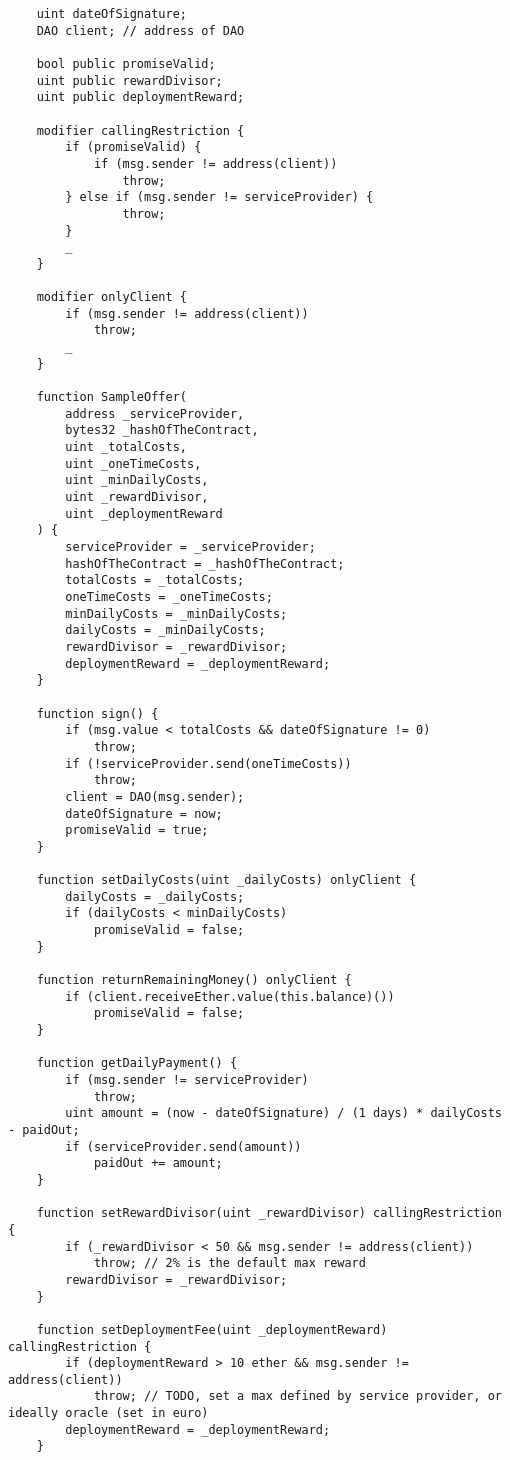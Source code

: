 \documentclass[9pt,oneside]{amsart}
\begin{document}
\begin{appendix}
\begin{verbatim}
    uint dateOfSignature;
    DAO client; // address of DAO

    bool public promiseValid;
    uint public rewardDivisor;
    uint public deploymentReward;

    modifier callingRestriction {
        if (promiseValid) {
            if (msg.sender != address(client))
                throw;
        } else if (msg.sender != serviceProvider) {
                throw;
        }
        _
    }

    modifier onlyClient {
        if (msg.sender != address(client))
            throw;
        _
    }

    function SampleOffer(
        address _serviceProvider,
        bytes32 _hashOfTheContract,
        uint _totalCosts,
        uint _oneTimeCosts,
        uint _minDailyCosts,
        uint _rewardDivisor,
        uint _deploymentReward
    ) {
        serviceProvider = _serviceProvider;
        hashOfTheContract = _hashOfTheContract;
        totalCosts = _totalCosts;
        oneTimeCosts = _oneTimeCosts;
        minDailyCosts = _minDailyCosts;
        dailyCosts = _minDailyCosts;
        rewardDivisor = _rewardDivisor;
        deploymentReward = _deploymentReward;
    }

    function sign() {
        if (msg.value < totalCosts && dateOfSignature != 0)
            throw;
        if (!serviceProvider.send(oneTimeCosts))
            throw;
        client = DAO(msg.sender);
        dateOfSignature = now;
        promiseValid = true;
    }

    function setDailyCosts(uint _dailyCosts) onlyClient {
        dailyCosts = _dailyCosts;
        if (dailyCosts < minDailyCosts)
            promiseValid = false;
    }

    function returnRemainingMoney() onlyClient {
        if (client.receiveEther.value(this.balance)())
            promiseValid = false;
    }

    function getDailyPayment() {
        if (msg.sender != serviceProvider)
            throw;
        uint amount = (now - dateOfSignature) / (1 days) * dailyCosts - paidOut;
        if (serviceProvider.send(amount))
            paidOut += amount;
    }

    function setRewardDivisor(uint _rewardDivisor) callingRestriction {
        if (_rewardDivisor < 50 && msg.sender != address(client))
            throw; // 2% is the default max reward
        rewardDivisor = _rewardDivisor;
    }

    function setDeploymentFee(uint _deploymentReward) callingRestriction {
        if (deploymentReward > 10 ether && msg.sender != address(client))
            throw; // TODO, set a max defined by service provider, or ideally oracle (set in euro)
        deploymentReward = _deploymentReward;
    }


\end{verbatim}
\end{appendix}
\end{document}
